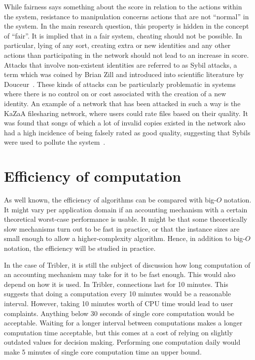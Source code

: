 \documentclass[a4paper,11pt]{book}
\theoremstyle{definition}
\begin{document}
While fairness says something about the score in relation to the actions within
the system, resistance to manipulation concerns actions that are not ``normal''
in the system. In the main research question, this property is hidden in the concept of
``fair''. It is implied that in a fair system, cheating should not be possible.
In particular, lying of any sort, creating extra or new identities
and any other actions than participating in the network should not lead to an
increase in score. Attacks that involve non-existent identities are referred to
as Sybil attacks, a term which was coined by Brian Zill and introduced into
scientific literature by Douceur~\cite{douceur2002sybil}.
These kinds of attacks can be particularly problematic in systems where
there is no control on or cost associated with the creation of a new identity.
An example of a network that has been attacked in such a way is the KaZaA
filesharing network, where users could rate files based on their quality.
It was found that songs of which a lot of invalid copies existed in
the network also had a high incidence of being falsely rated as good
quality, suggesting that Sybils were used to pollute the system~\cite{liang2005pollution}.


\section{Efficiency of computation}

As well known, the efficiency of algorithms can be compared with big-$O$ notation.
It might vary per application domain if an accounting mechanism with a certain
theoretical worst-case performance is usable. It might be that some
theoretically slow mechanisms turn out to be fast in practice, or that the
instance sizes are small enough to allow a higher-complexity algorithm. Hence,
in addition to big-$O$ notation, the efficiency will be studied in practice.

In the case of Tribler, it is still the subject of discussion how long computation
of an accounting mechanism may take for it to be fast enough. This would also 
depend on how it is used. In Tribler, connections last for 10 minutes. This suggests
that doing a computation every 10 minutes would be a reasonable interval. However,
taking 10 minutes worth of CPU time would lead to user complaints. Anything below
30 seconds of single core computation would be acceptable. Waiting for a longer
interval between computations makes a longer computation time acceptable, but this
comes at a cost of relying on slightly outdated values for decision making. 
Performing one computation daily would make 5 minutes of single core computation
time an upper bound. 
\end{document}
